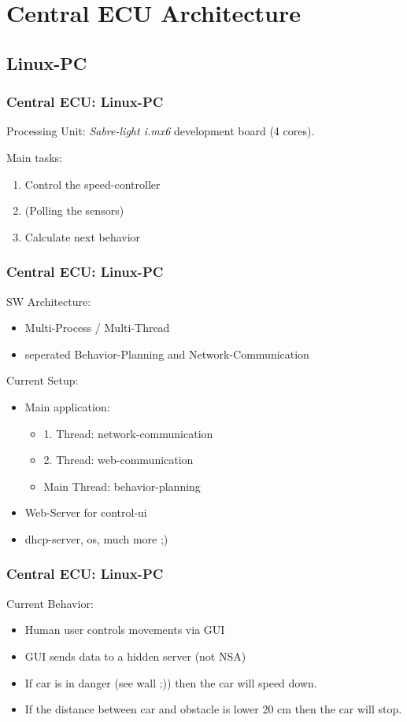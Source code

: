 \documentclass{beamer}
\begin{document}
\section{Central ECU Architecture}

\subsection{Linux-PC}

\begin{frame}
	\frametitle{Central ECU: Linux-PC}
	Processing Unit: \textsl{Sabre-light i.mx6} development board (4 cores).\\ \vspace{1em}	
	
	Main tasks:
	\begin{enumerate}
		\item Control the speed-controller
		\item (Polling the sensors)
		\item Calculate next behavior
	\end{enumerate}
\end{frame}

\begin{frame}
	\frametitle{Central ECU: Linux-PC}
	SW Architecture:
	\begin{itemize}
		\item Multi-Process / Multi-Thread
		\item seperated Behavior-Planning and Network-Communication
	\end{itemize} \vspace{1em}
	
	Current Setup:
	\begin{itemize}
		\item Main application: 
		\begin{itemize}
			\item 1. Thread: network-communication
			\item 2. Thread: web-communication
			\item Main Thread: behavior-planning
		\end{itemize}		 
		\item Web-Server for control-ui
		\item dhcp-server, os, much more ;)
	\end{itemize}
\end{frame}

\begin{frame}
	\frametitle{Central ECU: Linux-PC}
	Current Behavior:
	\begin{itemize}
		\item Human user controls movements via GUI
		\item GUI sends data to a hidden server (not NSA)
		\item If car is in danger (see wall ;)) then the car will speed down.
		\item If the distance between car and obstacle is lower 20 cm then the car will stop.
	\end{itemize}
\end{frame}
\end{document}

